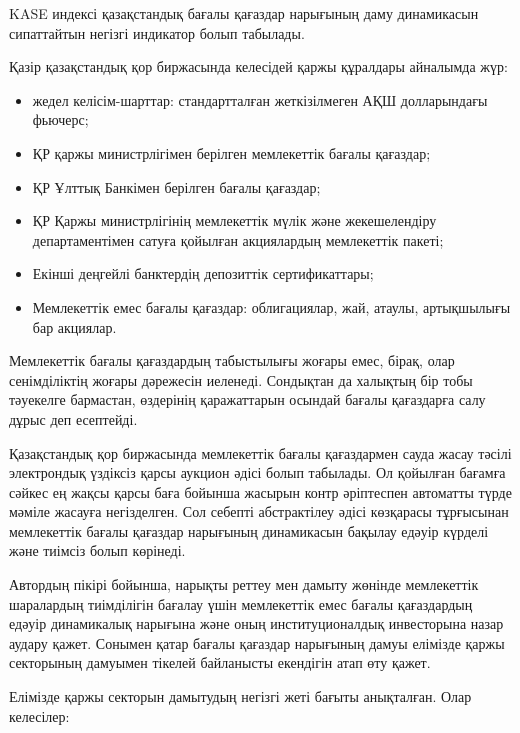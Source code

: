 \begin{multicols}{2}
KASE индексі қазақстандық бағалы қағаздар нарығының даму динамикасын
сипаттайтын негізгі индикатор болып табылады.

Қазір қазақстандық қор биржасында келесідей қаржы құралдары айналымда
жүр:

\begin{itemize}
\item
  жедел келісім-шарттар: стандартталған жеткізілмеген АҚШ долларындағы
  фьючерс;
\item
  ҚР қаржы министрлігімен берілген мемлекеттік бағалы қағаздар;
\item
  ҚР Ұлттық Банкімен берілген бағалы қағаздар;
\item
  ҚР Қаржы министрлігінің мемлекеттік мүлік және жекешелендіру
  департаментімен сатуға қойылған акциялардың мемлекеттік пакеті;
\item
  Екінші деңгейлі банктердің депозиттік сертификаттары;
\item
  Мемлекеттік емес бағалы қағаздар: облигациялар, жай, атаулы,
  артықшылығы бар акциялар.
\end{itemize}

Мемлекеттік бағалы қағаздардың табыстылығы жоғары емес, бірақ, олар
сенімділіктің жоғары дәрежесін иеленеді. Сондықтан да халықтың бір тобы
тәуекелге бармастан, өздерінің қаражаттарын осындай бағалы қағаздарға
салу дұрыс деп есептейді.

Қазақстандық қор биржасында мемлекеттік бағалы қағаздармен сауда жасау
тәсілі электрондық үздіксіз қарсы аукцион әдісі болып табылады. Ол
қойылған бағамға сәйкес ең жақсы қарсы баға бойынша жасырын контр
әріптеспен автоматты түрде мәміле жасауға негізделген. Сол себепті
абстрактілеу әдісі көзқарасы тұрғысынан мемлекеттік бағалы қағаздар
нарығының динамикасын бақылау едәуір күрделі және тиімсіз болып
көрінеді.

Автордың пікірі бойынша, нарықты реттеу мен дамыту жөнінде мемлекеттік
шаралардың тиімділігін бағалау үшін мемлекеттік емес бағалы қағаздардың
едәуір динамикалық нарығына және оның институционалдық инвесторына назар
аудару қажет. Сонымен қатар бағалы қағаздар нарығының дамуы елімізде
қаржы секторының дамуымен тікелей байланысты екендігін атап өту қажет.

Елімізде қаржы секторын дамытудың негізгі жеті бағыты анықталған. Олар
келесілер:


\end{multicols}
